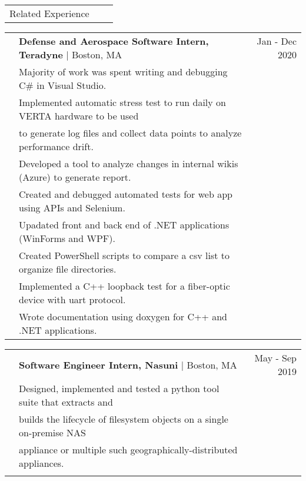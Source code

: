 \documentclass[letterpaper,10pt,oneside]{article}
\begin{document}
\noindent \begin{tabularx}{\linewidth}{@{} l l R }
     \Large{Related Experience}\\
\end{tabularx}

\noindent \begin{tabularx}{\linewidth}{@{} l l R }
     & \textbf{Defense and Aerospace Software Intern, Teradyne} $\mid$ Boston, MA & Jan - Dec 2020 \\
     & \indent Majority of work was spent writing and debugging C\# in Visual Studio.\\
     & \indent Implemented automatic stress test to run daily on VERTA hardware to be used\\
     & \indent \space \space to generate log files and collect data points to analyze performance drift.\\
     & \indent Developed a tool to analyze changes in internal wikis (Azure) to generate report.\\
     & \indent Created and debugged automated tests for web app using APIs and Selenium.\\
     & \indent Upadated front and back end of .NET applications (WinForms and WPF).\\
     & \indent Created PowerShell scripts to compare a csv list to organize file directories.\\
     & \indent Implemented a C++ loopback test for a fiber-optic device with uart protocol.\\
     & \indent Wrote documentation using doxygen for C++ and .NET applications.\\
\end {tabularx}

\noindent \begin{tabularx}{\linewidth}{@{} l l R }
     & \textbf{Software Engineer Intern, Nasuni} $\mid$ Boston, MA & May - Sep 2019 \\
     & \indent Designed, implemented and tested a python tool suite that extracts and\\
     & \indent \space \space builds the lifecycle of filesystem objects on a single on-premise NAS\\
     & \indent \space \space appliance or multiple such geographically-distributed appliances.\\
     \\
\end{tabularx}
\end{document}
